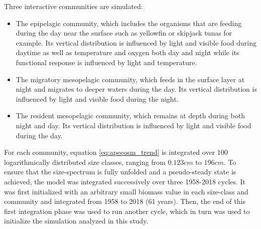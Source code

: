 %
%

Three interactive communities are simulated:
\begin{itemize}
\item{The epipelagic community, which includes the organisms that are feeding during the day near the surface such as yellowfin or skipjack tunas for example. Its vertical distribution is influenced by light and visible food during daytime as well as temperature and oxygen both day and night while its functional response is influenced by light and temperature.}
\item{The migratory mesopelagic community, which feeds in the surface layer at night and migrates to deeper waters during the day. Its vertical distribution is influenced by light and visible food during the night.}
\item{The resident mesopelagic community, which remains at depth during both night and day. Its vertical distribution is influenced by light and visible food during the day.}
\end{itemize}

For each community, equation \ref{eq:apecosm_trend} is integrated over 100 logarithmically distributed size classes, ranging from $0.123cm$ to $196cm$. To ensure that the size-spectrum is fully unfolded and a pseudo-steady state is achieved, the model was integrated successively over three 1958-2018 cycles. It was first initialized with an arbitrary small biomass value in each size-class and community and integrated from 1958 to 2018 (61 years). Then, the end of this first integration phase was used to run another cycle, which in turn was used to initialize the simulation analyzed in this study.

